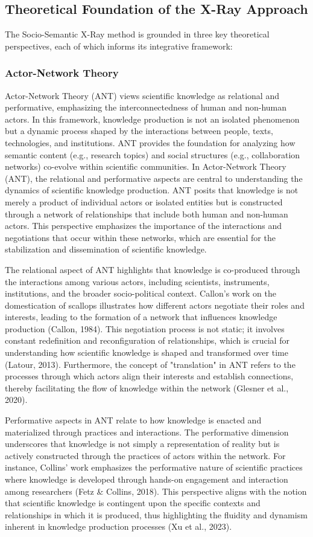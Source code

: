 \documentclass[12pt]{article}
\begin{document}
\subsection{Theoretical Foundation of the X-Ray Approach}
The Socio-Semantic X-Ray method is grounded in three key theoretical perspectives, each of which informs its integrative framework:

\subsubsection{Actor-Network Theory}
Actor-Network Theory (ANT) views scientific knowledge as relational and performative, emphasizing the interconnectedness of human and non-human actors. In this framework, knowledge production is not an isolated phenomenon but a dynamic process shaped by the interactions between people, texts, technologies, and institutions. ANT provides the foundation for analyzing how semantic content (e.g., research topics) and social structures (e.g., collaboration networks) co-evolve within scientific communities.
In Actor-Network Theory (ANT), the relational and performative aspects are central to understanding the dynamics of scientific knowledge production. ANT posits that knowledge is not merely a product of individual actors or isolated entities but is constructed through a network of relationships that include both human and non-human actors. This perspective emphasizes the importance of the interactions and negotiations that occur within these networks, which are essential for the stabilization and dissemination of scientific knowledge.

The relational aspect of ANT highlights that knowledge is co-produced through the interactions among various actors, including scientists, instruments, institutions, and the broader socio-political context. Callon’s work on the domestication of scallops illustrates how different actors negotiate their roles and interests, leading to the formation of a network that influences knowledge production (Callon, 1984). This negotiation process is not static; it involves constant redefinition and reconfiguration of relationships, which is crucial for understanding how scientific knowledge is shaped and transformed over time (Latour, 2013). Furthermore, the concept of "translation" in ANT refers to the processes through which actors align their interests and establish connections, thereby facilitating the flow of knowledge within the network (Glesner et al., 2020).

Performative aspects in ANT relate to how knowledge is enacted and materialized through practices and interactions. The performative dimension underscores that knowledge is not simply a representation of reality but is actively constructed through the practices of actors within the network. For instance, Collins' work emphasizes the performative nature of scientific practices where knowledge is developed through hands-on engagement and interaction among researchers (Fetz \& Collins, 2018). This perspective aligns with the notion that scientific knowledge is contingent upon the specific contexts and relationships in which it is produced, thus highlighting the fluidity and dynamism inherent in knowledge production processes (Xu et al., 2023).
\end{document}
